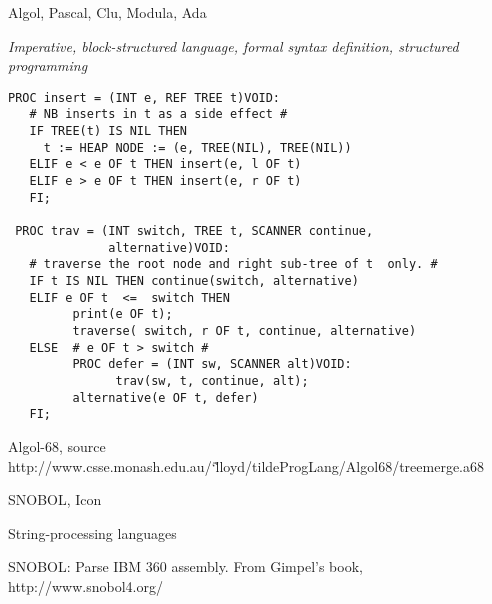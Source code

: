 \documentclass{plt}
\begin{document}
\begin{frame}[fragile]{Algol, Pascal, Clu, Modula, Ada}

\emph{Imperative, block-structured language, formal syntax definition,
  structured programming}

\begin{shadowblock}
\begin{lstlisting}[basicstyle={\fontsize{9}{9.5}\selectfont\ttfamily},language=Algol]
PROC insert = (INT e, REF TREE t)VOID:
   # NB inserts in t as a side effect #
   IF TREE(t) IS NIL THEN
     t := HEAP NODE := (e, TREE(NIL), TREE(NIL))
   ELIF e < e OF t THEN insert(e, l OF t)
   ELIF e > e OF t THEN insert(e, r OF t)
   FI;

 PROC trav = (INT switch, TREE t, SCANNER continue,
              alternative)VOID:
   # traverse the root node and right sub-tree of t  only. #
   IF t IS NIL THEN continue(switch, alternative)
   ELIF e OF t  <=  switch THEN
         print(e OF t);
         traverse( switch, r OF t, continue, alternative)
   ELSE  # e OF t > switch #
         PROC defer = (INT sw, SCANNER alt)VOID:
               trav(sw, t, continue, alt);
         alternative(e OF t, defer)
   FI;
\end{lstlisting}
\end{shadowblock}

\tiny Algol-68, source http://www.csse.monash.edu.au/\char`\~lloyd/tildeProgLang/Algol68/treemerge.a68

\end{frame}

\begin{frame}[fragile]{SNOBOL, Icon}

\alert{String-processing languages}


\tiny SNOBOL: Parse IBM 360 assembly.  From Gimpel's book, http://www.snobol4.org/

\end{frame}
\end{document}
